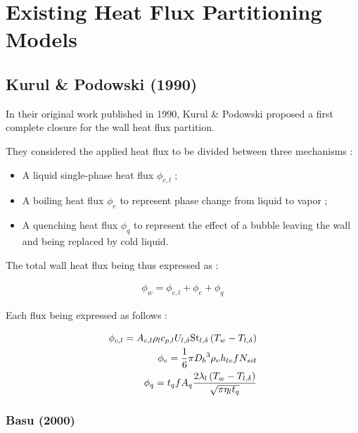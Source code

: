 
\chapter{Existing Heat Flux Partitioning Models} %

\label{ch:name} %


\section{Kurul \& Podowski (1990)}


In their original work published in 1990, Kurul \& Podowski proposed a first complete closure for the wall heat flux partition.


\npar
They considered the applied heat flux to be divided between three mechanisms :

\begin{itemize}
\item A liquid single-phase heat flux $\phi_{c,l}$ ;
\item A boiling heat flux $\phi_{e}$ to represent phase change from liquid to vapor ;
\item A quenching heat flux $\phi_{q}$ to represent the effect of a bubble leaving the wall and being replaced by cold liquid.
\end{itemize}

The total wall heat flux being thus expressed as :

\begin{align}
\phi_{w}=\phi_{c,l}+\phi_{e}+\phi_{q}
\end{align}

Each flux being expressed as follows : 

\begin{align}
\phi_{c,l}=A_{c,l} \rho_{l} c_{p,l}U_{l,\delta} \mathrm{St}_{l,\delta}\left( T_{w}-T_{l,\delta} \right)\\
\label{eq:phie_KP}
\phi_{e}=\frac{1}{6}\pi {D_{b}}^{3}\rho_{v}h_{lv}fN_{sit}\\
\phi_{q}=t_{q}fA_{q}\frac{2\lambda_{l}\left( T_{w}-T_{l,\delta} \right)}{\sqrt{\pi \eta_{l} t_{q}}}
\end{align}


\subsection{Basu (2000)}

